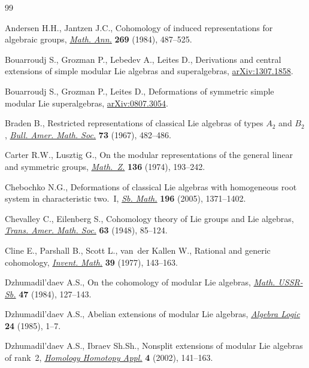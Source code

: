 \begin{thebibliography}{99}
\footnotesize\itemsep=0pt

Andersen H.H., Jantzen J.C., Cohomology of induced representations for
 algebraic groups, \href{https://doi.org/10.1007/BF01450762}{\textit{Math. Ann.}} \textbf{269} (1984), 487--525.

Bouarroudj S., Grozman P., Lebedev A., Leites D., Derivations and central
 extensions of simple modular {L}ie algebras and superalgebras,
 \href{https://arxiv.org/abs/1307.1858}{arXiv:1307.1858}.

Bouarroudj S., Grozman P., Leites D., Deformations of symmetric simple modular
 {L}ie superalgebras, \href{https://arxiv.org/abs/0807.3054}{arXiv:0807.3054}.

Braden B., Restricted representations of classical {L}ie algebras of types
 {$A_{2}$} and {$B_{2}$}, \href{https://doi.org/10.1090/S0002-9904-1967-11788-9}{\textit{Bull. Amer. Math. Soc.}} \textbf{73} (1967),
 482--486.

Carter R.W., Lusztig G., On the modular representations of the general linear
 and symmetric groups, \href{https://doi.org/10.1007/BF01214125}{\textit{Math.~Z.}} \textbf{136} (1974), 193--242.

Chebochko N.G., Deformations of classical {L}ie algebras with homogeneous root
 system in characteristic two.~{I}, \href{https://doi.org/10.1070/SM2005v196n09ABEH003647}{\textit{Sb. Math.}} \textbf{196} (2005),
 1371--1402.

Chevalley C., Eilenberg S., Cohomology theory of {L}ie groups and {L}ie
 algebras, \href{https://doi.org/10.2307/1990637}{\textit{Trans. Amer. Math. Soc.}} \textbf{63} (1948), 85--124.

Cline E., Parshall B., Scott L., van~der Kallen W., Rational and generic
 cohomology, \href{https://doi.org/10.1007/BF01390106}{\textit{Invent. Math.}} \textbf{39} (1977), 143--163.

Dzhumadil'daev A.S., On the cohomology of modular Lie algebras, \href{https://doi.org/10.1070/SM1984v047n01ABEH002634}{\textit{Math.
 USSR-Sb.}} \textbf{47} (1984), 127--143.

Dzhumadil'daev A.S., Abelian extensions of modular {L}ie algebras,
 \href{https://doi.org/10.1007/BF01978701}{\textit{Algebra Logic}} \textbf{24} (1985), 1--7.

Dzhumadil'daev A.S., Ibraev Sh.Sh., Nonsplit extensions of modular {L}ie algebras
 of rank~2, \href{https://doi.org/10.4310/hha.2002.v4.n2.a7}{\textit{Homology Homotopy Appl.}} \textbf{4} (2002), 141--163.


\end{thebibliography}
